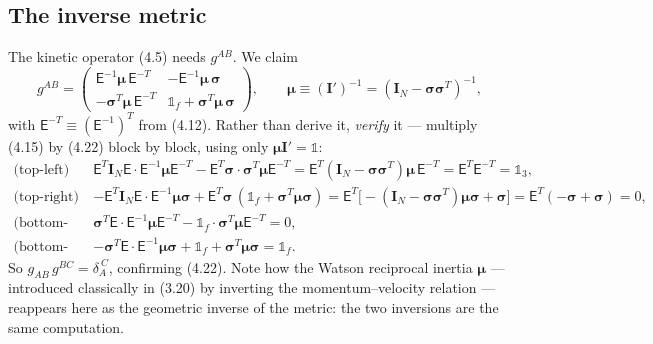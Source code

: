 \subsection{The inverse metric}

The kinetic operator (4.5) needs $g^{AB}$. We claim
\begin{equation}
\boxed{\;
g^{AB}=
\begin{pmatrix}
\mathsf E^{-1}\boldsymbol\mu\,\mathsf E^{-T} & -\mathsf E^{-1}\boldsymbol\mu\,\boldsymbol\sigma\\[3pt]
-\boldsymbol\sigma^{T}\boldsymbol\mu\,\mathsf E^{-T} & \mathbb 1_f+\boldsymbol\sigma^{T}\boldsymbol\mu\,\boldsymbol\sigma
\end{pmatrix},
\qquad \boldsymbol\mu\equiv(\mathbf I')^{-1}=(\mathbf I_N-\boldsymbol\sigma\boldsymbol\sigma^{T})^{-1},\;}\tag{4.22}
\end{equation}
with $\mathsf E^{-T}\equiv(\mathsf E^{-1})^{T}$ from (4.12). Rather than derive it, \emph{verify} it --- multiply (4.15) by (4.22) block by block, using only $\boldsymbol\mu\mathbf I'=\mathbb 1$:
\begin{equation}
\begin{aligned}
\text{(top-left)}\quad &\mathsf E^{T}\mathbf I_N\mathsf E\cdot\mathsf E^{-1}\boldsymbol\mu\mathsf E^{-T}-\mathsf E^{T}\boldsymbol\sigma\cdot\boldsymbol\sigma^{T}\boldsymbol\mu\mathsf E^{-T}
=\mathsf E^{T}(\mathbf I_N-\boldsymbol\sigma\boldsymbol\sigma^{T})\boldsymbol\mu\,\mathsf E^{-T}=\mathsf E^{T}\mathsf E^{-T}=\mathbb 1_3,\\
\text{(top-right)}\quad &-\mathsf E^{T}\mathbf I_N\mathsf E\cdot\mathsf E^{-1}\boldsymbol\mu\boldsymbol\sigma+\mathsf E^{T}\boldsymbol\sigma\,(\mathbb 1_f+\boldsymbol\sigma^{T}\boldsymbol\mu\boldsymbol\sigma)
=\mathsf E^{T}\bigl[-(\mathbf I_N-\boldsymbol\sigma\boldsymbol\sigma^{T})\boldsymbol\mu\boldsymbol\sigma+\boldsymbol\sigma\bigr]=\mathsf E^{T}(-\boldsymbol\sigma+\boldsymbol\sigma)=0,\\
\text{(bottom-left)}\quad &\boldsymbol\sigma^{T}\mathsf E\cdot\mathsf E^{-1}\boldsymbol\mu\mathsf E^{-T}-\mathbb 1_f\cdot\boldsymbol\sigma^{T}\boldsymbol\mu\mathsf E^{-T}=0,\\
\text{(bottom-right)}\quad &-\boldsymbol\sigma^{T}\mathsf E\cdot\mathsf E^{-1}\boldsymbol\mu\boldsymbol\sigma+\mathbb 1_f+\boldsymbol\sigma^{T}\boldsymbol\mu\boldsymbol\sigma=\mathbb 1_f .
\end{aligned}\tag{4.23}
\end{equation}
So $g_{AB}\,g^{BC}=\delta_A^{\ C}$, confirming (4.22). Note how the Watson reciprocal inertia $\boldsymbol\mu$ --- introduced classically in (3.20) by inverting the momentum--velocity relation --- reappears here as the geometric inverse of the metric: the two inversions are the same computation.

